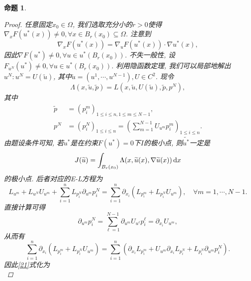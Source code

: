 \documentclass[12pt,a4paper]{article}
\newtheorem{proposition}[theorem]{命题}
\begin{document}
\begin{proposition}
\begin{proof}
        任意固定$x_0 \in \Omega$, 我们选取充分小的$ r > 0$使得$\nabla_x F(u^*(x)) \neq 0, \forall x \in B_r(x_0) \subseteq \Omega$.
        注意到 
        \begin{equation*}
            \nabla_xF(u^*(x)) = \nabla_uF(u^*(x)) \cdot \nabla u^*(x),
        \end{equation*}
        因此$\nabla F(u^*) \neq 0, \forall u \in u^*(B_r(x_0))$. 不失一般性, 设$F_{u^N}(u^*) \neq 0, \forall u \in u^*(B_r(x_0))$.
        利用隐函数定理, 我们可以局部地解出$u^N\colon u^N = U(\widetilde{u})$, 其中$\widetilde{u} = (u^1, \cdots, u^{N - 1}), U \in C^2$.
        现令 
        \begin{equation*}
            \Lambda(x, \widetilde{u}, \widetilde{p}) = L(x, \widetilde{u}, U(\widetilde{u}), \widetilde{p}, p^N),
        \end{equation*}
        其中
        \begin{align*}
            \widetilde{p} &= (p_i^m)_{1 \leq i \leq n, 1 \leq m \leq N - 1}, \\ 
            p^N &= (p_i^N)_{1 \leq i \leq n} = \left(\sum_{m = 1}^{N -1}U_{u^m}p_i^m\right)_{1 \leq i \leq n}.
        \end{align*}
        由题设条件可知, 若$u^*$是在约束$F(u^*) = 0$下$I$的极小点, 则$\widetilde{u^*}$一定是
        \begin{equation*}
            J(\widetilde{u}) = \int_{B_r(x_0)}\Lambda(x, \widetilde{u}(x), \nabla\widetilde{u}(x)) \,{\rm d}x
        \end{equation*}
        的极小点. 后者对应的E-L方程为
        \begin{equation}\label{21}
            L_{u^m} + L_{u^N}U_{u^m} + \sum_{i = 1}^nL_{p_i^N}\partial_{u^m}p_i^N = \sum_{i = 1}^n\partial_{x_i}(L_{p_i^m} + L_{p_i^N}U_{u^m}), \quad \forall m = 1, \cdots, N - 1.
        \end{equation} 
        直接计算可得 
        \begin{equation*}
            \partial_{u^m}p_i^N = \sum_{\ell = 1}^{N - 1}\partial_{u^m}U_{u^{\ell}}p_i^\ell =\partial_{x_i}U_{u^m},
        \end{equation*}
        从而有  
        \begin{equation*}
            \sum_{i = 1}^n\partial_{x_i}(L_{p_i^m} + L_{p_i^N}U_{u^m}) = \sum_{i = 1}^n(\partial_{x_i}L_{p_i^m} + U_{u^m}\partial_{x_i}L_{p_i^N} +L_{p_i^N}\partial_{u^m}p_i^N).
        \end{equation*}
        因此\eqref{21}式化为 
        \begin{equation}\label{22}

\end{equation}
\end{proof}
\end{proposition}
\end{document}
